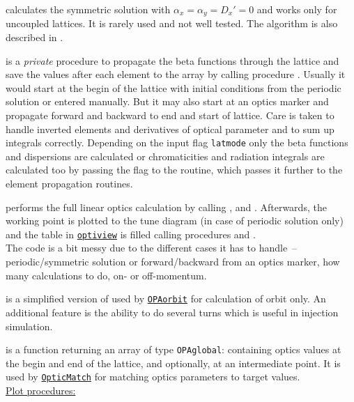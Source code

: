 \documentclass[12pt]{article}
\newcommand\code[1]{{\tt #1}}
\newcommand{\unico}[1]{{\color{burntorange}\code{#1}}}
\newcommand{\vrcod}[2]{\opauni{#1}:\unico{#2}}
\newcommand{\opagui}[1]{\colorbox{blue!20}{\code{#1}}}
\newcommand{\ogui}[1]{\hyperref[#1]{\opagui{#1}}}
\newcommand{\opauni}[1]{\colorbox{orange!30}{\code{#1}}}
\newcommand{\ouni}[1]{\hyperref[#1]{\opauni{#1}}}
\newcommand{\todo}[1]{{\color{red} #1}}
\begin{document}
{\unico{Symmetric} calculates the symmetric solution with 
$\alpha_x=\alpha_y=D_x'=0$ and works only for uncoupled lattices. It is rarely used and not well tested. The algorithm is also described in \cite{kwille}.

\unico{LinOp} is a {\em private} procedure to propagate the beta functions through the lattice and save the values after each element to the \unico{Opval} array by calling procedure \unico{StoVar}. Usually it would start at the begin of the lattice with initial conditions from the periodic solution or entered manually. But it may also start at an optics marker and propagate forward and backward to end and start of lattice. Care is taken to handle inverted elements and derivatives of optical parameter and to sum up integrals correctly. Depending on the input flag \code{latmode} only the beta functions and dispersions are calculated or chromaticities and radiation integrals are calculated too by passing the flag to the \unico{Lattel} routine, which passes it further to the element propagation routines.

\unico{OpticCalc} performs the full linear optics calculation by calling \unico{ClosedOrbit}, \unico{Periodic} and \unico{LinOp}. Afterwards, the working point is plotted to the tune diagram (in case of periodic solution only) and the table in \ogui{optiview} is filled calling procedures \unico{FillBeamTab} and \unico{FillBetaTab}. \\
\todo{The code is a bit messy due to the different cases it has to handle~-- periodic/symmetric solution or forward/backward from an optics marker, how many calculations to do, on- or off-momentum.} 

\unico{OrbitCalc} is a simplified version of \unico{OpticCalc} used by \ogui{OPAorbit} for calculation of orbit only. An additional feature is the ability to do several turns which is useful in injection simulation.

\unico{MatchValues} is a function returning an array of type \vrcod{OPAglobal}{MatchFuncType} containing optics values at the begin and end of the lattice, and optionally, at an intermediate point. It is used by \ouni{OpticMatch} for matching optics parameters to target values.\\

\underline{Plot procedures:}

}
\end{document}
